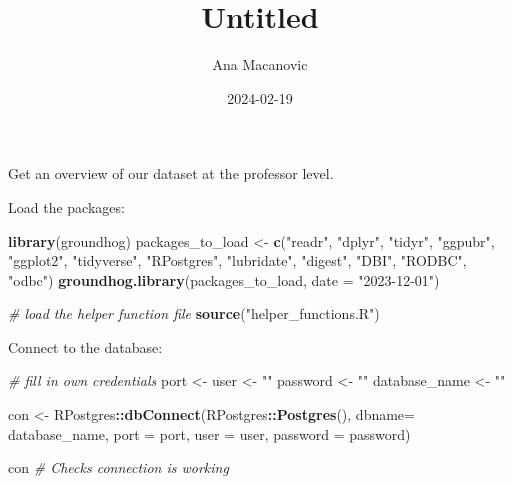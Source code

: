 \documentclass[
]{article}
\title{Untitled}
\author{Ana Macanovic}
\date{2024-02-19}
\newenvironment{Shaded}{\begin{snugshade}}{\end{snugshade}}
\newcommand{\AttributeTok}[1]{\textcolor[rgb]{0.13,0.29,0.53}{#1}}
\newcommand{\CommentTok}[1]{\textcolor[rgb]{0.56,0.35,0.01}{\textit{#1}}}
\newcommand{\FunctionTok}[1]{\textcolor[rgb]{0.13,0.29,0.53}{\textbf{#1}}}
\newcommand{\NormalTok}[1]{#1}
\newcommand{\OtherTok}[1]{\textcolor[rgb]{0.56,0.35,0.01}{#1}}
\newcommand{\SpecialCharTok}[1]{\textcolor[rgb]{0.81,0.36,0.00}{\textbf{#1}}}
\newcommand{\StringTok}[1]{\textcolor[rgb]{0.31,0.60,0.02}{#1}}
\begin{document}
\maketitle

Get an overview of our dataset at the professor level.

Load the packages:

\begin{Shaded}
\begin{Highlighting}[]
\FunctionTok{library}\NormalTok{(groundhog)}
\NormalTok{packages\_to\_load }\OtherTok{\textless{}{-}} \FunctionTok{c}\NormalTok{(}\StringTok{"readr"}\NormalTok{, }\StringTok{"dplyr"}\NormalTok{, }\StringTok{"tidyr"}\NormalTok{, }\StringTok{"ggpubr"}\NormalTok{,}
                      \StringTok{"ggplot2"}\NormalTok{,}
                      \StringTok{"tidyverse"}\NormalTok{, }\StringTok{"RPostgres"}\NormalTok{, }\StringTok{"lubridate"}\NormalTok{,}
                      \StringTok{"digest"}\NormalTok{, }\StringTok{"DBI"}\NormalTok{, }\StringTok{"RODBC"}\NormalTok{, }\StringTok{"odbc"}\NormalTok{)}
\FunctionTok{groundhog.library}\NormalTok{(packages\_to\_load, }\AttributeTok{date =} \StringTok{"2023{-}12{-}01"}\NormalTok{)}

\CommentTok{\# load the helper function file}
\FunctionTok{source}\NormalTok{(}\StringTok{"helper\_functions.R"}\NormalTok{)}
\end{Highlighting}
\end{Shaded}

Connect to the database:

\begin{Shaded}
\begin{Highlighting}[]
\CommentTok{\# fill in own credentials}
\NormalTok{port }\OtherTok{\textless{}{-}} 
\NormalTok{user }\OtherTok{\textless{}{-}} \StringTok{""}
\NormalTok{password }\OtherTok{\textless{}{-}} \StringTok{""}
\NormalTok{database\_name }\OtherTok{\textless{}{-}} \StringTok{""}

\NormalTok{con }\OtherTok{\textless{}{-}}\NormalTok{ RPostgres}\SpecialCharTok{::}\FunctionTok{dbConnect}\NormalTok{(RPostgres}\SpecialCharTok{::}\FunctionTok{Postgres}\NormalTok{(),}
                 \AttributeTok{dbname=}\NormalTok{ database\_name,}
                 \AttributeTok{port =}\NormalTok{ port,}
                 \AttributeTok{user =}\NormalTok{ user, }
                 \AttributeTok{password =}\NormalTok{ password)}

\NormalTok{con }\CommentTok{\# Checks connection is working}
\end{Highlighting}
\end{Shaded}
\end{document}
